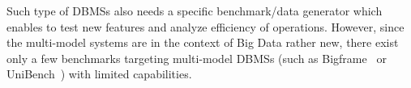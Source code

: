 Such type of DBMSs also needs a specific benchmark/data generator which enables to test new features and analyze efficiency of operations. However, since the multi-model systems are in the context of Big Data rather new, there exist only a few benchmarks targeting multi-model DBMSs (such as Bigframe~\cite{journals/pvldb/KunjirKB14} or UniBench~\cite{conf/cidr/lu17}) with limited capabilities.



